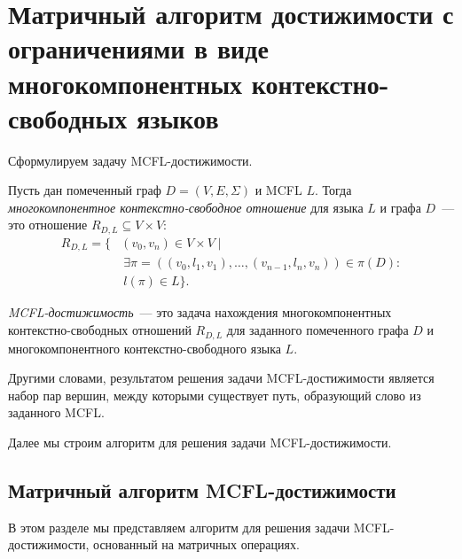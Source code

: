\section{Матричный алгоритм достижимости с ограничениями в виде многокомпонентных контекстно-свободных языков}

Сформулируем задачу MCFL-достижимости.

\begin{definition}
	Пусть дан помеченный граф $D = (V, E, \Sigma)$ и MCFL $L$. Тогда \emph{многокомпонентное контекстно-свободное отношение} для языка $L$ и графа $D$~--- это отношение $R_{D, L} \subseteq V \times V$:
	\begin{equation*} \label{eq:MCFGExample}
		\begin{split}
			R_{D, L} = \{ &(v_0, v_n) \in V \times V  \mid \\ &\ \exists \pi = ((v_0, l_1, v_1), \ldots, (v_{n-1}, l_n, v_n)) \in \pi(D): \\
			&\ l(\pi) \in L \}.
		\end{split}
	\end{equation*}
\end{definition}

\begin{definition}
	\emph{MCFL-достижимость}~--- это задача нахождения  многокомпонентных контекстно-свободных отношений $R_{D, L}$ для заданного помеченного графа $D$ и многокомпонентного контекстно-свободного языка $L$.
\end{definition}

Другими словами, результатом решения задачи MCFL-достижимости является набор пар вершин, между которыми существует путь, образующий слово из заданного MCFL.

Далее мы строим алгоритм для решения задачи MCFL-достижимости.

\subsection{Матричный алгоритм MCFL-достижимости}
\label{subsec:all-path-algo}
В этом разделе мы представляем алгоритм для решения задачи MCFL-достижимости, основанный на матричных операциях.

